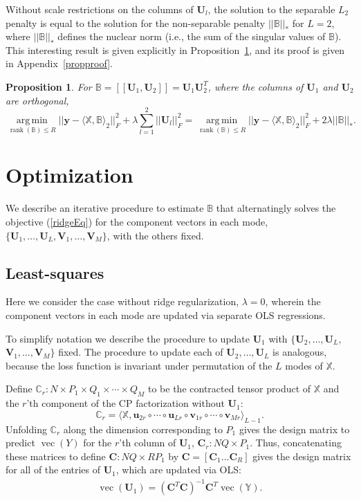 \documentclass[12pt]{article}
\def\ctimes{\times \cdots \times}
\def\U{\mathbf{U}}
\def\u{\mathbf{u}}
\def\XX{\mathbb{X}}
\def\YY{\mathbb{Y}}
\def\V{\mathbf{V}}
\def\BB{\mathbb{B}}
\def\C{\mathbf{C}}
\def\CC{\mathbb{C}}
\def\v{\mathbf{v}}
\def\tp#1{[\![#1]\!]}
\newcommand{\tprod}[3] {
  \langle #1, #2 \rangle_{#3}}
\DeclareMathOperator*{\amin}{arg\,min}
\def\argmin#1{\underset{#1}{\amin}}
\DeclareMathOperator*{\rank}{rank}
\DeclareMathOperator*{\vect}{vec}
\newtheorem{prop}{Proposition}
\begin{document}
Without scale restrictions on the columns of $\U_l$, the solution to the separable $L_2$ penalty is equal to the solution for the non-separable penalty $||\BB||_{*}$ for $L=2$, where $||\BB||_{*}$ defines the nuclear norm (i.e., the sum of the singular values of $\BB$).  This interesting result is given explicitly in Proposition~\ref{prop1}, and its proof is given in Appendix~\ref{propproof}. 
\begin{prop}
\label{prop1}
For $\BB = \tp{\U_1,\U_2} = \U_1 \U_2^T$, where the columns of $\U_1$ and $\U_2$ are orthogonal,   
	\[\argmin{\rank(\BB)\leq R} ||\mathbf{y}- \tprod{\XX}{\BB}{2}||_F^2 + \lambda \sum_{l=1}^2||\U_l||_F^2 = \argmin{\rank(\BB)\leq R} ||\mathbf{y}- \tprod{\XX}{\BB}{2}||_F^2 + 2 \lambda ||\BB||_*.\]
\end{prop}
   
\section{Optimization}
\label{opt}
We describe an iterative procedure to estimate $\BB$ that alternatingly solves the objective (\ref{ridgeEq}) for the component vectors in each mode, $\{\U_1,\hdots,\U_L, \V_1,\hdots,\V_M\}$, with the others fixed.  

\subsection{Least-squares}
\label{lsAlg}
Here we consider the case without ridge regularization, $\lambda=0$, wherein the component vectors in each mode are updated via separate OLS regressions.  

To simplify notation we describe the procedure to update $\U_1$ with $\{\U_2,\hdots,\U_L,$ $\V_1,\hdots,\V_M\}$ fixed.  The procedure to update each of $\U_2,\hdots, \U_L$ is analogous, because the loss function is invariant under permutation of the $L$ modes of $\XX$.  

Define $\CC_r: N \times P_1 \times Q_1 \ctimes Q_M$ to be the contracted tensor product of $\XX$ and the $r$'th component of the CP factorization without $\U_1$:
\[\CC_r = \tprod{\XX}{\u_{2r} \circ \cdots \circ \u_{Lr} \circ \v_{1r} \circ \cdots \circ \v_{Mr}}{L-1}.\]   
Unfolding $\CC_r$ along the dimension corresponding to $P_1$ gives the design matrix to predict $\vect(Y)$ for the $r$'th column of $\U_1$, $\C_r: N Q \times P_1$.  Thus, concatenating these matrices to define $\C: N Q \times R P_1$ by $\C = \left[\C_1 \hdots  \C_R\right]$ gives the design matrix for all of the entries of $\U_1$,  which are updated via OLS: 
\begin{align}
\vect(\U_1) = \left(\C^T\C \right)^{-1}\C^T \vect(\YY). \label{upU}	
\end{align}
  
\end{document}

